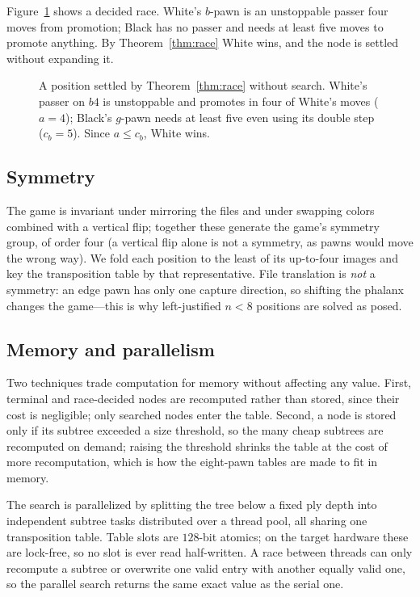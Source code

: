\documentclass[11pt]{article}
\theoremstyle{plain}
\theoremstyle{definition}
\newcommand{\pg}[1]{\chessboard[setfen={#1}, showmover=false, boardfontsize=13pt, label=false]}
\begin{document}
Figure~\ref{fig:race} shows a decided race. White's $b$-pawn is an unstoppable
passer four moves from promotion; Black has no passer and needs at least five
moves to promote anything. By Theorem~\ref{thm:race} White wins, and the node is
settled without expanding it.

\begin{figure}[t]
\centering
\pg{8/6p1/8/8/1P6/8/8/8 w - - 0 1}
\caption{A position settled by Theorem~\ref{thm:race} without search. White's
passer on $b4$ is unstoppable and promotes in four of White's moves ($a=4$);
Black's $g$-pawn needs at least five even using its double step ($c_b=5$). Since
$a\le c_b$, White wins.}
\label{fig:race}
\end{figure}

\subsection{Symmetry}\label{sec:sym}

The game is invariant under mirroring the files and under swapping colors combined
with a vertical flip; together these generate the game's symmetry group, of order
four (a vertical flip alone is not a symmetry, as pawns would move the wrong way).
We fold each position to the least of its up-to-four images and key the
transposition table by that representative. File translation is \emph{not} a
symmetry: an edge pawn has only one capture direction, so shifting the phalanx
changes the game---this is why left-justified $n<8$ positions are solved as
posed.

\subsection{Memory and parallelism}\label{sec:mem}

Two techniques trade computation for memory without affecting any value. First,
terminal and race-decided nodes are recomputed rather than stored, since their
cost is negligible; only searched nodes enter the table. Second, a node is stored
only if its subtree exceeded a size threshold, so the many cheap subtrees are
recomputed on demand; raising the threshold shrinks the table at the cost of more
recomputation, which is how the eight-pawn tables are made to fit in memory.

The search is parallelized by splitting the tree below a fixed ply depth into
independent subtree tasks distributed over a thread pool, all sharing one
transposition table. Table slots are $128$-bit atomics; on the target hardware
these are lock-free, so no slot is ever read half-written. A race between threads
can only recompute a subtree or overwrite one valid entry with another equally
valid one, so the parallel search returns the same exact value as the serial one.
\end{document}
